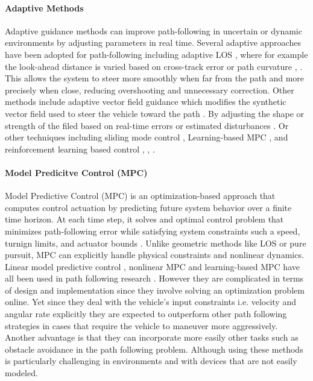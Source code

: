 \paragraph*{Adaptive Methods}
Adaptive guidance methods can improve path-following in uncertain or dynamic environments by adjusting parameters in real time. Several adaptive approaches have been adopted for path-following including adaptive LOS \cite{fossen_direct_2017}, where for example the look-ahead distance is varied based on cross-track error \cite{lekkas_integral_2014} or path curvature \cite{liu_path_2017}, \cite{hung_review_2023}. This allows the system to steer more smoothly when far from the path and more precisely when close, reducing overshooting and unnecessary correction.
\newline \newline 
Other methods include adaptive vector field guidance which modifies the synthetic vector field used to steer the vehicle toward the path \cite{wang_adaptive_2022} \cite{wang_adaptive_2022}. By adjusting the shape or strength of the filed based on real-time errors or estimated disturbances \cite{soetanto_adaptive_2003}. Or other techniques including sliding mode control \cite{soetanto_adaptive_2003} \cite{dagci_path_2003}, Learning-based MPC \cite{noauthor_learningbased_nodate}, \cite{rokonuzzaman_effective_2023} and reinforcement learning based control \cite{wang_path_2024}, \cite{martinsen_reinforcement_2020}, \cite{hung_review_2023}.

\paragraph*{Model Predicitve Control (MPC)}
Model Predictive Control (MPC) is an optimization-based approach that computes control actuation by predicting future system behavior over a finite time horizon. At each time step, it solves and optimal control problem that minimizes path-following error while satisfying system constraints such a speed, turnign limits, and actuator bounds \cite{hung_review_2023}. 
\newline \newline
Unlike geometric methods like LOS or pure pursuit, MPC can explicitly handle physical constraints and nonlinear dynamics. Linear model predictive control \cite{kanjanawanishkul_mpc-based_2015}, nonlinear MPC \cite{guo_model_2019} \cite{xu_model_2021} and learning-based MPC have all been used in path following research \cite{hung_review_2023}. However they are complicated in terms of design and implementation since they involve solving an optimization problem online. Yet since they deal with the vehicle's input constraints i.e. velocity and angular rate explicitly they are  expected to outperform other path following strategies in cases that require the vehicle to maneuver more aggressively. Another advantage is that they can incorporate more easily other tasks such as obstacle avoidance in the path following problem. Although using these methods is particularly challenging in environments and with devices that are not easily modeled.



